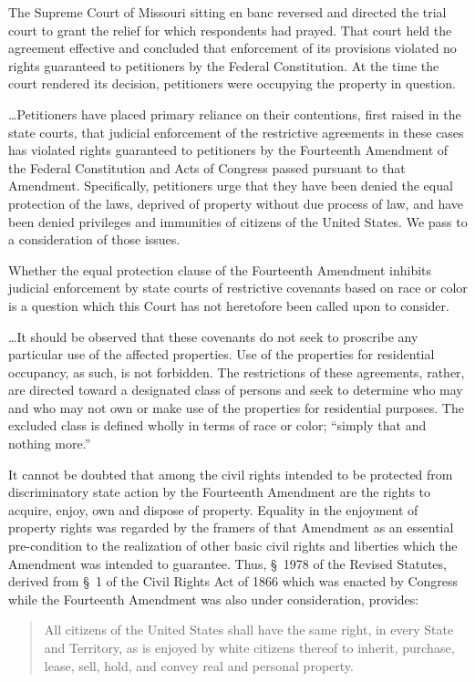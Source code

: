 The Supreme Court of Missouri sitting en banc reversed and directed the trial
court to grant the relief for which respondents had prayed. That court held the
agreement effective and concluded that enforcement of its provisions violated no
rights guaranteed to petitioners by the Federal Constitution. At the time the
court rendered its decision, petitioners were occupying the property in
question.

\ldots Petitioners have placed primary reliance on their contentions, first
raised in the state courts, that judicial enforcement of the restrictive
agreements in these cases has violated rights guaranteed to petitioners by the
Fourteenth Amendment of the Federal Constitution and Acts of Congress passed
pursuant to that Amendment. Specifically, petitioners urge that they have been
denied the equal protection of the laws, deprived of property without due
process of law, and have been denied privileges and immunities of citizens of
the United States. We pass to a consideration of those issues.


Whether the equal protection clause of the Fourteenth Amendment inhibits
judicial enforcement by state courts of restrictive covenants based on race or
color is a question which this Court has not heretofore been called upon to
consider.

\ldots It should be observed that these covenants do not seek to proscribe any
particular use of the affected properties. Use of the properties for residential
occupancy, as such, is not forbidden. The restrictions of these agreements,
rather, are directed toward a designated class of persons and seek to determine
who may and who may not own or make use of the properties for residential
purposes. The excluded class is defined wholly in terms of race or color;
``simply that and nothing more.''

It cannot be doubted that among the civil rights intended to be protected from
discriminatory state action by the Fourteenth Amendment are the rights to
acquire, enjoy, own and dispose of property. Equality in the enjoyment of
property rights was regarded by the framers of that Amendment as an essential
pre-condition to the realization of other basic civil rights and liberties which
the Amendment was intended to guarantee. Thus, \S~1978 of the Revised Statutes,
derived from \S~1 of the Civil Rights Act of 1866 which was enacted by Congress
while the Fourteenth Amendment was also under consideration, provides:
\begin{quote}
All citizens of the United States shall have the same right, in every State
and Territory, as is enjoyed by white citizens thereof to inherit, purchase,
lease, sell, hold, and convey real and personal property.
\end{quote}

